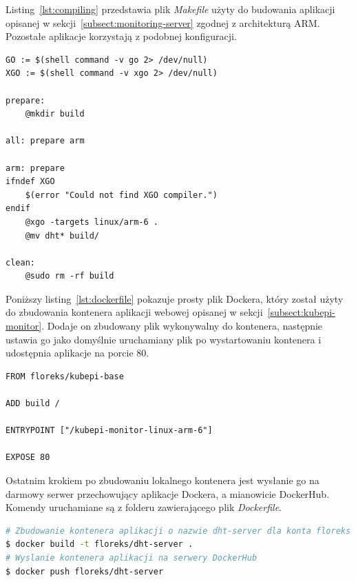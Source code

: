 \documentclass[12pt]{report}
\begin{document}
{\noindent Listing~\ref{lst:compiling} przedstawia plik \textit{Makefile} użyty do budowania aplikacji opisanej w sekcji~\ref{subsect:monitoring-server} zgodnej z architekturą ARM. Pozostałe aplikacje korzystają z podobnej konfiguracji.
\begin{lstlisting}[caption=Makefile użyty do budowania aplikacji dla architektury ARM,label=lst:compiling]
GO := $(shell command -v go 2> /dev/null)
XGO := $(shell command -v xgo 2> /dev/null)

prepare:
	@mkdir build

all: prepare arm

arm: prepare
ifndef XGO
	$(error "Could not find XGO compiler.")
endif
	@xgo -targets linux/arm-6 .
	@mv dht* build/

clean:
	@sudo rm -rf build
\end{lstlisting}

\newpage
\noindent Poniższy listing~\ref{lst:dockerfile} pokazuje prosty plik Dockera, który został użyty do zbudowania kontenera aplikacji webowej opisanej w sekcji~\ref{subsect:kubepi-monitor}. Dodaje on zbudowany plik wykonywalny do kontenera, następnie ustawia go jako domyślnie uruchamiany plik po wystartowaniu kontenera i udostępnia aplikacje na porcie 80.
\begin{lstlisting}[caption=Przykładowy plik Dockera dla aplikacji webowej,label=lst:dockerfile]
FROM floreks/kubepi-base

ADD build /

ENTRYPOINT ["/kubepi-monitor-linux-arm-6"]

EXPOSE 80
\end{lstlisting}

\noindent Ostatnim krokiem po zbudowaniu lokalnego kontenera jest wysłanie go na darmowy serwer przechowujący aplikacje Dockera, a mianowicie DockerHub. Komendy uruchamiane są z folderu zawierającego plik \textit{Dockerfile}.
\begin{lstlisting}[language=bash]
# Zbudowanie kontenera aplikacji o nazwie dht-server dla konta floreks
$ docker build -t floreks/dht-server .
# Wyslanie kontenera aplikacji na serwery DockerHub
$ docker push floreks/dht-server
\end{lstlisting}


\newpage
}
\end{document}
